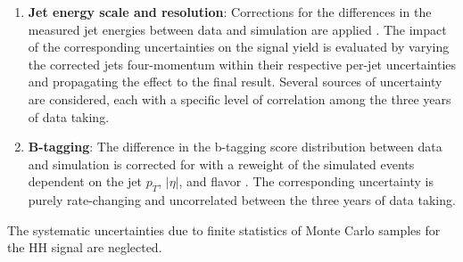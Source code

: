 \begin{enumerate}
  \item \textbf{Jet energy scale and resolution}: Corrections for the differences in the measured jet energies between data and simulation are applied \cite{Khachatryan:2016kdb}. The impact of the corresponding uncertainties on the signal yield is evaluated by varying the corrected jets four-momentum within their respective per-jet uncertainties and propagating the effect to the final result. Several sources of uncertainty are considered, each with a specific level of correlation among the three years of data taking. 

  \item \textbf{B-tagging}: The difference in the b-tagging score distribution between data and simulation is corrected for with a reweight of the simulated events dependent on the jet $p_T$, $|\eta|$, and flavor \cite{Sirunyan:2017ezt}. The corresponding uncertainty is purely rate-changing and uncorrelated between the three years of data taking.




  
\end{enumerate}

The systematic uncertainties due to finite statistics of Monte Carlo samples for the HH signal are neglected.
